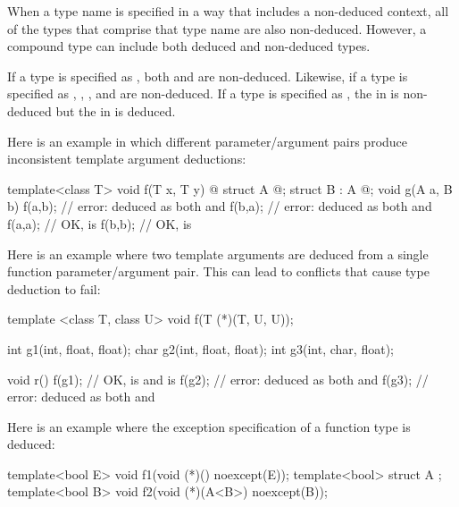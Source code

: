 \pnum
When a type name is specified in a way that includes a non-deduced
context, all of the types that comprise that type name are also
non-deduced.
However, a compound type can include both deduced and non-deduced types.
\begin{example}
If a type is specified as
,
both
and
are non-deduced.
Likewise, if a type is specified as
,
,
,
and
are non-deduced.
If a type is specified as
,
the
in
is non-deduced but
the
in
is deduced.
\end{example}

\pnum
\begin{example}
Here is an example in which different parameter/argument pairs produce
inconsistent template argument deductions:

\begin{codeblock}
template<class T> void f(T x, T y) { @\commentellip@ }
struct A { @\commentellip@ };
struct B : A { @\commentellip@ };
void g(A a, B b) {
  f(a,b);           // error:  deduced as both  and 
  f(b,a);           // error:  deduced as both  and 
  f(a,a);           // OK,  is 
  f(b,b);           // OK,  is 
}
\end{codeblock}

Here is an example where two template arguments are deduced from a
single function parameter/argument pair.
This can lead to conflicts
that cause type deduction to fail:

\begin{codeblock}
template <class T, class U> void f(T (*)(T, U, U));

int g1(int, float, float);
char g2(int, float, float);
int g3(int, char, float);

void r() {
  f(g1);            // OK,  is  and  is 
  f(g2);            // error:  deduced as both  and 
  f(g3);            // error:  deduced as both  and 
}
\end{codeblock}

Here is an example where the exception specification of a function type
is deduced:

\begin{codeblock}
template<bool E> void f1(void (*)() noexcept(E));
template<bool> struct A { };
template<bool B> void f2(void (*)(A<B>) noexcept(B));


\end{codeblock}
\end{example}
